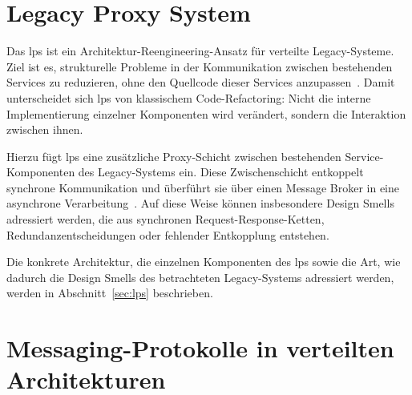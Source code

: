\section{Legacy Proxy System}
\label{sec:grundlagen-lps}

Das \gls{lps} ist ein Architektur-Reengineering-Ansatz für verteilte Legacy-Systeme. Ziel ist es, strukturelle Probleme in der Kommunikation zwischen bestehenden Services zu reduzieren, ohne den Quellcode dieser Services anzupassen~\citep{liebig_2025_architectural_refactoring}.
Damit unterscheidet sich \gls{lps} von klassischem Code-Refactoring: Nicht die interne Implementierung einzelner Komponenten wird verändert, sondern die Interaktion zwischen ihnen.

Hierzu fügt \gls{lps} eine zusätzliche Proxy-Schicht zwischen bestehenden Service-Komponenten des Legacy-Systems ein. Diese Zwischenschicht entkoppelt synchrone Kommunikation und überführt sie über einen Message Broker in eine asynchrone Verarbeitung~\citep{liebig_2025_architectural_refactoring}. Auf diese Weise können insbesondere Design Smells adressiert werden, die aus synchronen Request-Response-Ketten, Redundanzentscheidungen oder fehlender Entkopplung entstehen.

Die konkrete Architektur, die einzelnen Komponenten des \gls{lps} sowie die Art, wie dadurch die Design Smells des betrachteten Legacy-Systems adressiert werden, werden in Abschnitt~\ref{sec:lps} beschrieben.



\newpage

\section{Messaging-Protokolle in verteilten Architekturen}

